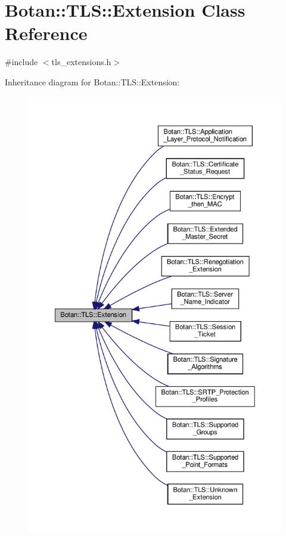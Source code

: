 \hypertarget{class_botan_1_1_t_l_s_1_1_extension}{}\section{Botan\+:\+:T\+LS\+:\+:Extension Class Reference}
\label{class_botan_1_1_t_l_s_1_1_extension}


{\ttfamily \#include $<$tls\+\_\+extensions.\+h$>$}



Inheritance diagram for Botan\+:\+:T\+LS\+:\+:Extension\+:
\nopagebreak
\begin{figure}[H]
\begin{center}
\leavevmode
\includegraphics[height=550pt]{class_botan_1_1_t_l_s_1_1_extension__inherit__graph}
\end{center}
\end{figure}
